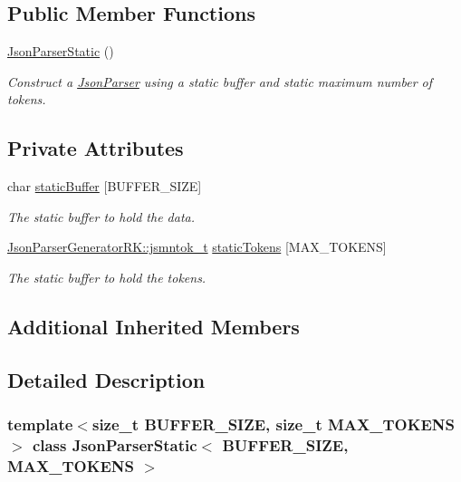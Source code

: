 \subsection*{Public Member Functions}
\begin{DoxyCompactItemize}
\item 
\hyperlink{class_json_parser_static_a6d0aa92ea003e383a1efa1a8533e1e60}{Json\+Parser\+Static} ()
\begin{DoxyCompactList}\small\item\em Construct a \hyperlink{class_json_parser}{Json\+Parser} using a static buffer and static maximum number of tokens. \end{DoxyCompactList}\end{DoxyCompactItemize}
\subsection*{Private Attributes}
\begin{DoxyCompactItemize}
\item 
char \hyperlink{class_json_parser_static_a7098ca786f3e7ecacbe2824e49c4fc23}{static\+Buffer} \mbox{[}B\+U\+F\+F\+E\+R\+\_\+\+S\+I\+ZE\mbox{]}
\begin{DoxyCompactList}\small\item\em The static buffer to hold the data. \end{DoxyCompactList}\item 
\hyperlink{struct_json_parser_generator_r_k_1_1jsmntok__t}{Json\+Parser\+Generator\+R\+K\+::jsmntok\+\_\+t} \hyperlink{class_json_parser_static_a46bd3b4c6e0d3205dfdcb6ef1e5dab8c}{static\+Tokens} \mbox{[}M\+A\+X\+\_\+\+T\+O\+K\+E\+NS\mbox{]}
\begin{DoxyCompactList}\small\item\em The static buffer to hold the tokens. \end{DoxyCompactList}\end{DoxyCompactItemize}
\subsection*{Additional Inherited Members}


\subsection{Detailed Description}
\subsubsection*{template$<$size\+\_\+t B\+U\+F\+F\+E\+R\+\_\+\+S\+I\+ZE, size\+\_\+t M\+A\+X\+\_\+\+T\+O\+K\+E\+NS$>$\newline
class Json\+Parser\+Static$<$ B\+U\+F\+F\+E\+R\+\_\+\+S\+I\+Z\+E, M\+A\+X\+\_\+\+T\+O\+K\+E\+N\+S $>$}

